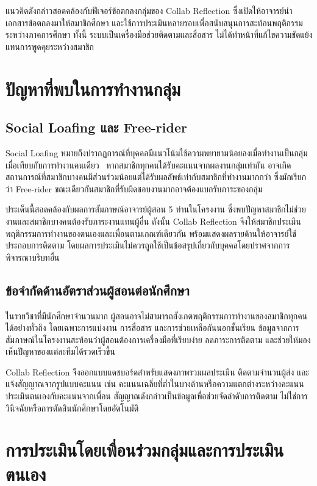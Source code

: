 แนวคิดดังกล่าวสอดคล้องกับฟีเจอร์ข้อตกลงกลุ่มของ Collab Reflection ซึ่งเปิดให้อาจารย์นำเอกสารข้อตกลงมาให้สมาชิกศึกษา และใช้การประเมินหลายรอบเพื่อสนับสนุนการสะท้อนพฤติกรรมระหว่างภาคการศึกษา ทั้งนี้ ระบบเป็นเครื่องมือช่วยติดตามและสื่อสาร ไม่ได้ทำหน้าที่แก้ไขความขัดแย้งแทนการพูดคุยระหว่างสมาชิก

\section{ปัญหาที่พบในการทำงานกลุ่ม}

\subsection{Social Loafing และ Free-rider}

Social Loafing หมายถึงปรากฏการณ์ที่บุคคลมีแนวโน้มใช้ความพยายามน้อยลงเมื่อทำงานเป็นกลุ่ม เมื่อเทียบกับการทำงานคนเดียว~\cite{latane1979many} หากสมาชิกทุกคนได้รับคะแนนจากผลงานกลุ่มเท่ากัน อาจเกิดสถานการณ์ที่สมาชิกบางคนมีส่วนร่วมน้อยแต่ได้รับผลลัพธ์เท่ากับสมาชิกที่ทำงานมากกว่า ซึ่งมักเรียกว่า Free-rider ขณะเดียวกันสมาชิกที่รับผิดชอบงานมากอาจต้องแบกรับภาระของกลุ่ม

ประเด็นนี้สอดคล้องกับผลการสัมภาษณ์อาจารย์ผู้สอน 5 ท่านในโครงงาน ซึ่งพบปัญหาสมาชิกไม่ช่วยงานและสมาชิกบางคนต้องรับภาระงานแทนผู้อื่น ดังนั้น Collab Reflection จึงให้สมาชิกประเมินพฤติกรรมการทำงานของตนเองและเพื่อนตามเกณฑ์เดียวกัน พร้อมแสดงผลรายด้านให้อาจารย์ใช้ประกอบการติดตาม โดยผลการประเมินไม่ควรถูกใช้เป็นข้อสรุปเกี่ยวกับบุคคลโดยปราศจากการพิจารณาบริบทอื่น

\subsection{ข้อจำกัดด้านอัตราส่วนผู้สอนต่อนักศึกษา}

ในรายวิชาที่มีนักศึกษาจำนวนมาก ผู้สอนอาจไม่สามารถสังเกตพฤติกรรมการทำงานของสมาชิกทุกคนได้อย่างทั่วถึง โดยเฉพาะการแบ่งงาน การสื่อสาร และการช่วยเหลือกันนอกชั้นเรียน ข้อมูลจากการสัมภาษณ์ในโครงงานสะท้อนว่าผู้สอนต้องการเครื่องมือที่เรียบง่าย ลดภาระการติดตาม และช่วยให้มองเห็นปัญหาของแต่ละทีมได้รวดเร็วขึ้น

Collab Reflection จึงออกแบบแดชบอร์ดสำหรับแสดงภาพรวมผลประเมิน ติดตามจำนวนผู้ส่ง และแจ้งสัญญาณจากรูปแบบคะแนน เช่น คะแนนเฉลี่ยที่ต่ำในบางด้านหรือความแตกต่างระหว่างคะแนนประเมินตนเองกับคะแนนจากเพื่อน สัญญาณดังกล่าวเป็นข้อมูลเพื่อช่วยจัดลำดับการติดตาม ไม่ใช่การวินิจฉัยหรือการตัดสินนักศึกษาโดยอัตโนมัติ

\section{การประเมินโดยเพื่อนร่วมกลุ่มและการประเมินตนเอง}

